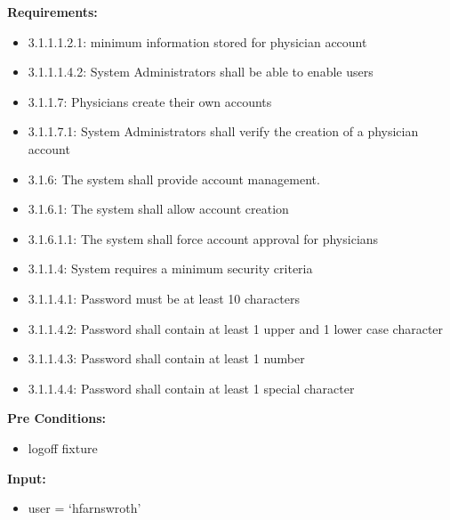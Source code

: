 \documentclass[letterpaper,10pt,english]{sphinxmanual}
\begin{document}
\begin{fulllineitems}
\label{STD/test_create_account:test_create_account.test_create_physician}
\textbf{Requirements:}
\begin{itemize}
\item {} 
3.1.1.1.2.1: minimum information stored for physician account

\item {} 
3.1.1.1.4.2: System Administrators shall be able to enable users

\item {} 
3.1.1.7: Physicians create their own accounts

\item {} 
3.1.1.7.1: System Administrators shall verify the creation of a physician account

\item {} 
3.1.6: The system shall provide account management.

\item {} 
3.1.6.1: The system shall allow account creation

\item {} 
3.1.6.1.1: The system shall force account approval for physicians

\item {} 
3.1.1.4: System requires a minimum security criteria

\item {} 
3.1.1.4.1: Password must be at least 10 characters

\item {} 
3.1.1.4.2: Password shall contain at least 1 upper and 1 lower case character

\item {} 
3.1.1.4.3: Password shall contain at least 1 number

\item {} 
3.1.1.4.4: Password shall contain at least 1 special character

\end{itemize}

\textbf{Pre Conditions:}
\begin{itemize}
\item {} 
logoff fixture

\end{itemize}

\textbf{Input:}
\begin{itemize}
\item {} 
user = `hfarnswroth'


\end{itemize}
\end{fulllineitems}
\end{document}
